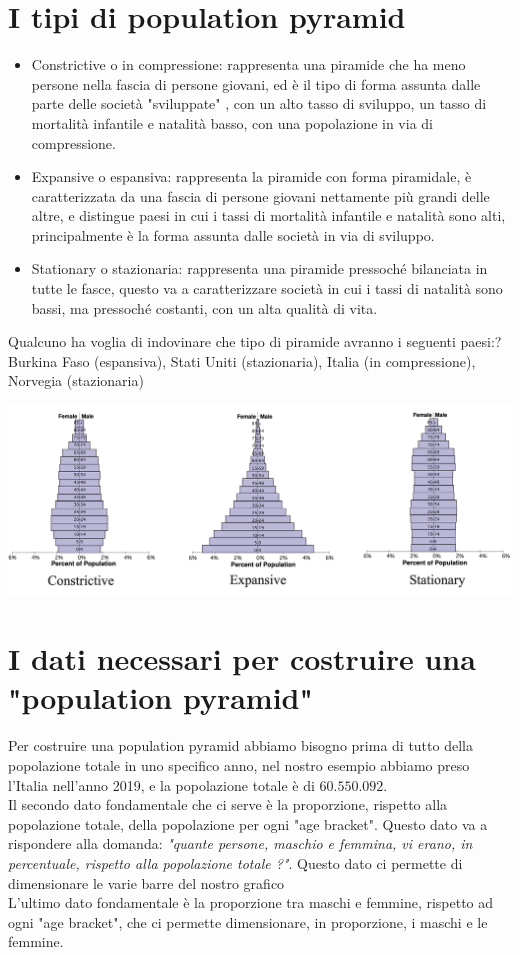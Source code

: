 \documentclass[11pt, oneside]{article}   	%
\begin{document}
\section{I tipi di population pyramid}
\begin{itemize}
\item Constrictive o in compressione: rappresenta una piramide che ha meno persone nella fascia di persone giovani, ed è il tipo di forma assunta dalle parte delle società "sviluppate" , con un alto tasso di sviluppo, un tasso di mortalità infantile e natalità basso, con una popolazione in via di compressione.
\item Expansive o espansiva: rappresenta la piramide con forma piramidale, è caratterizzata da una fascia di persone giovani nettamente più grandi delle altre, e distingue paesi in cui i tassi di mortalità infantile e natalità sono alti, principalmente è la forma assunta dalle società in via di sviluppo.
\item Stationary o stazionaria: rappresenta una piramide pressoché bilanciata in tutte le fasce, questo va a caratterizzare società in cui i tassi di natalità sono bassi, ma pressoché costanti, con un alta qualità di vita.
\end{itemize}
\footnotesize{}
Qualcuno ha voglia di indovinare che tipo di piramide avranno i seguenti paesi:?
Burkina Faso (espansiva), Stati Uniti (stazionaria), Italia (in compressione), Norvegia (stazionaria)

\normalsize{}

\begin{center}
\includegraphics[scale=0.3]{types}
\end{center}

\section{I dati necessari per costruire una "population pyramid"}
Per costruire una population pyramid abbiamo bisogno prima di tutto della popolazione totale in uno specifico anno, nel nostro esempio abbiamo preso l'Italia nell'anno 2019, e la popolazione totale è di $60.550.092$. \\
Il secondo dato fondamentale che ci serve è la proporzione, rispetto alla popolazione totale, della popolazione per ogni "age bracket". Questo dato va a rispondere alla domanda: \emph{"quante persone, maschio e femmina, vi erano, in percentuale, rispetto alla popolazione totale ?"}. Questo dato ci permette di dimensionare le varie barre del nostro grafico\\
L'ultimo dato fondamentale è la proporzione tra maschi e femmine, rispetto ad ogni "age bracket", che ci permette dimensionare, in proporzione, i maschi e le femmine.
\end{document}
